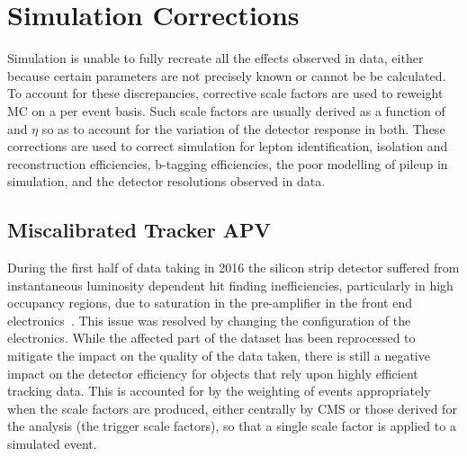 \section{Simulation Corrections}\label{sec:simCorrections}
Simulation is unable to fully recreate all the effects observed in data, either because certain parameters are not precisely known or cannot be be calculated.
To account for these discrepancies, corrective scale factors are used to reweight MC on a per event basis.
Such scale factors are usually derived as a function of \pt and $\eta$ so as to account for the variation of the detector response in both.
These corrections are used to correct simulation for lepton identification, isolation and reconstruction efficiencies, b-tagging efficiencies, the poor modelling of pileup in simulation, and the detector resolutions observed in data.

\subsection{Miscalibrated Tracker APV}\label{subsec:hipEffect}
During the first half of data taking in 2016 the silicon strip detector suffered from instantaneous luminosity dependent  hit finding inefficiencies, particularly in high occupancy regions, due to saturation in the pre-amplifier in the front end electronics~\cite{Fiori:2016ebh}.
This issue was resolved by changing the configuration of the electronics.
While the affected part of the dataset has been reprocessed to mitigate the impact on the quality of the data taken, there is still a negative impact on the detector efficiency for objects that rely upon highly efficient tracking data.
This is accounted for by the weighting of events appropriately when the scale factors are produced, either centrally by CMS or those derived for the analysis (\ie the trigger scale factors), so that a single scale factor is applied to a simulated event.


